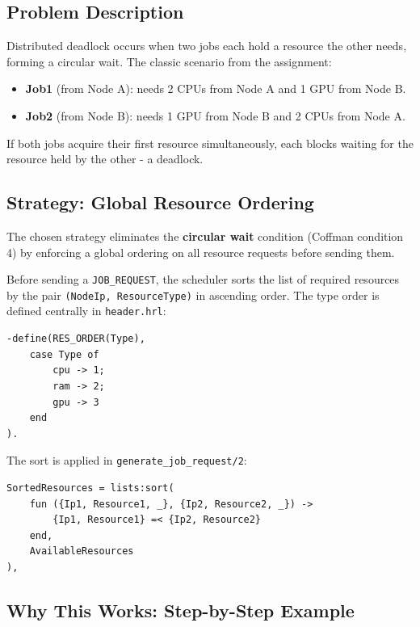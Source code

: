 \documentclass[12pt,a4paper]{article}
\begin{document}
\subsection{Problem Description}

Distributed deadlock occurs when two jobs each hold a resource the other needs,
forming a circular wait. The classic scenario from the assignment:

\begin{itemize}
  \item \textbf{Job1} (from Node A): needs 2 CPUs from Node A and 1 GPU from Node B.
  \item \textbf{Job2} (from Node B): needs 1 GPU from Node B and 2 CPUs from Node A.
\end{itemize}

If both jobs acquire their first resource simultaneously, each blocks waiting
for the resource held by the other - a deadlock.

\subsection{Strategy: Global Resource Ordering}

The chosen strategy eliminates the \textbf{circular wait} condition (Coffman condition 4)
by enforcing a global ordering on all resource requests before sending them.

Before sending a \texttt{JOB\_REQUEST}, the scheduler sorts the list of required resources
by the pair \texttt{(NodeIp, ResourceType)} in ascending order. The type order is
defined centrally in \texttt{header.hrl}:

\begin{lstlisting}
-define(RES_ORDER(Type),
    case Type of
        cpu -> 1;
        ram -> 2;
        gpu -> 3
    end
).
\end{lstlisting}

The sort is applied in \texttt{generate\_job\_request/2}:

\begin{lstlisting}
SortedResources = lists:sort(
    fun ({Ip1, Resource1, _}, {Ip2, Resource2, _}) ->
        {Ip1, Resource1} =< {Ip2, Resource2}
    end,
    AvailableResources
),
\end{lstlisting}

\subsection{Why This Works: Step-by-Step Example}
\end{document}
